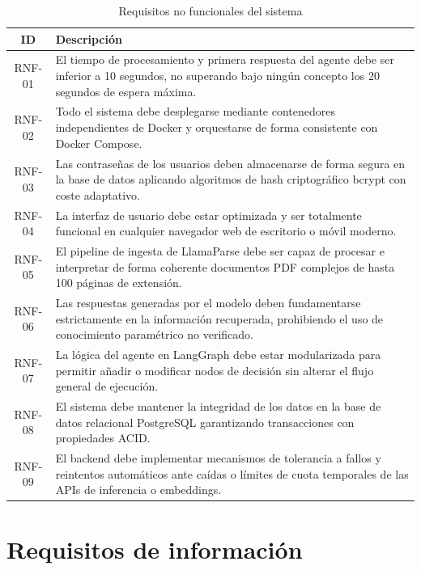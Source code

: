 \documentclass[12pt,a4paper,oneside]{report}
\begin{document}
\begin{table}[H]
    \centering
    \caption{Requisitos no funcionales del sistema}
    \begin{tabular}{@{}cp{12cm}@{}}
        \toprule
        \textbf{ID} & \textbf{Descripción}                                                                                     \\
        \midrule
        RNF-01      & El tiempo de procesamiento y primera respuesta del agente debe ser inferior a 10 segundos, no superando bajo ningún concepto los 20 segundos de espera máxima. \\
        RNF-02      & Todo el sistema debe desplegarse mediante contenedores independientes de Docker y orquestarse de forma consistente con Docker Compose. \\
        RNF-03      & Las contraseñas de los usuarios deben almacenarse de forma segura en la base de datos aplicando algoritmos de hash criptográfico bcrypt con coste adaptativo. \\
        RNF-04      & La interfaz de usuario debe estar optimizada y ser totalmente funcional en cualquier navegador web de escritorio o móvil moderno. \\
        RNF-05      & El pipeline de ingesta de LlamaParse debe ser capaz de procesar e interpretar de forma coherente documentos PDF complejos de hasta 100 páginas de extensión. \\
        RNF-06      & Las respuestas generadas por el modelo deben fundamentarse estrictamente en la información recuperada, prohibiendo el uso de conocimiento paramétrico no verificado. \\
        RNF-07      & La lógica del agente en LangGraph debe estar modularizada para permitir añadir o modificar nodos de decisión sin alterar el flujo general de ejecución. \\
        RNF-08      & El sistema debe mantener la integridad de los datos en la base de datos relacional PostgreSQL garantizando transacciones con propiedades ACID. \\
        RNF-09      & El backend debe implementar mecanismos de tolerancia a fallos y reintentos automáticos ante caídas o límites de cuota temporales de las APIs de inferencia o embeddings. \\
        \bottomrule
    \end{tabular}
\end{table}

\section{Requisitos de información}
\end{document}
